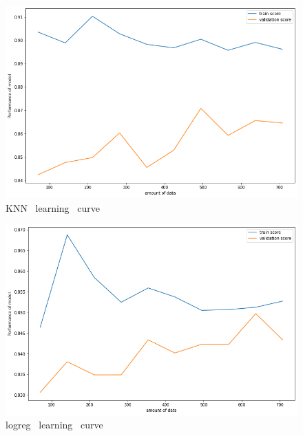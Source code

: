 \documentclass[12pt]{article}
\begin{document}
\begin{figure}[H]
\begin{center}
\includegraphics[scale=0.6]{learning_curve_1.png} 
\caption[]{ KNN \ learning \ curve }
\end{center}
\end{figure}

\begin{figure}[H]
\begin{center}
\includegraphics[scale=0.6]{learning_curve_2.png} 
\caption[]{ logreg \ learning \ curve }
\end{center}
\end{figure}
\end{document}
